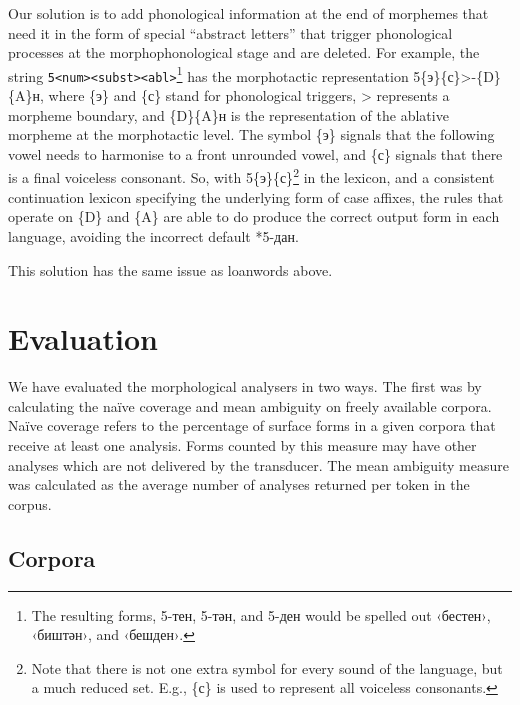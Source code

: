 \documentclass[a4paper,11pt,twocolumn]{article}
\begin{document}
Our solution is to add phonological information at the end of morphemes that need it in the form of special ``abstract letters'' that trigger phonological processes at the morphophonological stage and are deleted. For example, the string \texttt{5<num><subst><abl>}\footnote{The resulting forms, 5-тен, 5-тән, and 5-ден would be spelled out ‹бестен›, ‹биштән›, and ‹бешден›.} has
the morphotactic representation 5\{э\}\{с\}>-\{D\}\{A\}н, where \{э\} and \{с\} stand for phonological triggers, > represents a morpheme boundary, and \{D\}\{A\}н is the representation of the ablative morpheme at the morphotactic level.  The symbol \{э\} signals that the following vowel needs to harmonise to a front unrounded vowel, and \{с\} signals that there is a final voiceless consonant.  So, with 5\{э\}\{с\}\footnote{Note that there is not one extra symbol for every sound of the language, but a much reduced set.  E.g., \{с\} is used to represent all voiceless consonants.} in the lexicon, and a consistent continuation lexicon specifying the underlying form of case affixes, the rules that operate on \{D\} and \{A\} are able to do produce the correct output form in each language, avoiding the incorrect default *5-дан.


This solution has the same issue as loanwords above.


\section{Evaluation}\label{sec:evaluation}

We have evaluated the morphological analysers in two ways. The first was by calculating the naïve coverage and mean ambiguity on freely available corpora. Naïve coverage refers to the percentage of surface forms in a given corpora that receive at least one analysis.  Forms counted by this measure may have other analyses which are not delivered by the transducer. The mean ambiguity measure was calculated as the average number of analyses returned per token in the corpus.


\subsection{Corpora}
\end{document}
